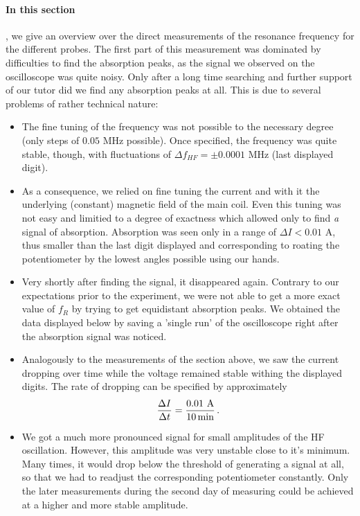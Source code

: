 \paragraph{In this section}, 
we give an overview over the direct measurements of the resonance frequency
for the different probes. The first part of this measurement was dominated by difficulties 
to find the absorption peaks, as the signal we observed on the oscilloscope was quite noisy. 
Only after a long time searching and further support of our tutor did we find any absorption 
peaks at all. This is due to several problems of rather technical nature:
\begin{itemize}
    \item
        The fine tuning of the frequency was not possible to the necessary degree (only
        steps of $0.05$ MHz possible). Once specified, the frequency was quite stable, though, 
        with fluctuations of $\Delta f_{HF} = \pm 0.0001$ MHz (last displayed digit).
    \item
        As a consequence, we relied on fine tuning the 
        current and with it the underlying (constant) magnetic field of the main coil. 
        Even this tuning was not easy and limitied to a degree of exactness which 
        allowed only to find \emph{a} signal of absorption. Absorption was seen only in 
        a range of $\Delta I < 0.01$ A, thus smaller than the last digit displayed and 
        corresponding to roating the potentiometer by the lowest angles possible using our hands. 
    \item
        Very shortly after finding the signal, it disappeared again.
        Contrary to our expectations prior to the experiment, 
        we were not able to get a more exact 
        value of $f_R$ by trying to get equidistant absorption peaks. 
        We obtained the data displayed below by saving a 'single run' of the 
        oscilloscope right after the absorption signal was noticed. 
    \item 
        Analogously to the measurements of the section above, we saw the current dropping 
        over time while the voltage remained stable withing the displayed digits. 
        The rate of dropping can be specified by approximately 
        \begin{equation}
            \frac{\Delta I }{\Delta t} = \frac{0.01 \, \, \mathrm{A}}{10 \, \mathrm{min}} \, .
        \end{equation}
    \item
        We got a much more pronounced signal for small amplitudes of the HF oscillation. 
        However, this amplitude was very unstable close to it's minimum. Many times, it would 
        drop below the threshold of generating a signal at all, so that we had to readjust the 
        corresponding potentiometer constantly. Only the later measurements during the second day 
        of measuring could be achieved at a higher and more stable amplitude. 
\end{itemize}
